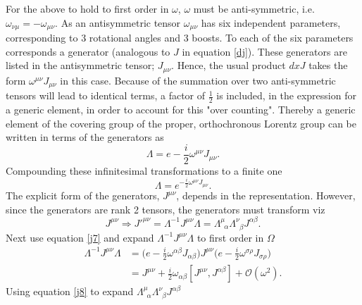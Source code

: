 For the above to hold to first order in $\omega$, $\omega$ must be anti-symmetric, i.e. $\omega_{\nu\mu}=-\omega_{\mu\nu}$. As an antisymmetric tensor $\omega_{\mu\nu}$ has six independent parameters, corresponding to $3$ rotational angles and $3$ boosts. To each of the six parameters corresponds a generator (analogous to $J$ in equation \eqref{dj}). These generators are listed in the antisymmetric tensor; $J_{\mu\nu}$. Hence, the usual product $dxJ$ takes the form $\omega^{\mu\nu}J_{\mu\nu}$ in this case. Because of the summation over two anti-symmetric tensors will lead to identical terms, a factor of $\frac{1}{2}$ is included, in the expression for a generic element, in order to account for this "over counting". Thereby a generic element of the covering group of the proper, orthochronous Lorentz group can be written in terms of the generators as
\begin{equation}
	\Lambda=e-\frac{i}{2}\omega^{\mu\nu}J_{\mu\nu}.
	\label{j7}
\end{equation} 
Compounding these infinitesimal transformations to a finite one
\begin{equation}
	\Lambda=e^{-\frac{i}{2}\omega^{\mu\nu}J_{\mu\nu}}.
\end{equation} 
The explicit form of the generators, $J^{\mu\nu}$, depends in the representation. However, since the generators are rank 2 tensors, the generators must transform viz
\begin{equation}
	J^{\mu\nu}\Rightarrow {J'}^{\mu\nu}=\Lambda^{-1}J^{\mu\nu}\Lambda=\Lambda^{\mu}_{\,\,\, \alpha}\Lambda^{\nu}_{\,\,\, \beta}J^{\alpha\beta}.
	\label{j6}
\end{equation} 
Next use equation \eqref{j7} and expand $\Lambda^{-1}J^{\mu\nu}\Lambda$ to first order in $\Omega$
\begin{equation}
	\begin{split}
		\Lambda^{-1}J^{\mu\nu}\Lambda&=\bigg(e-\frac{i}{2}\omega^{\alpha\beta}J_{\alpha\beta}\bigg)J^{\mu\nu}\bigg(e-\frac{i}{2}\omega^{\sigma\rho}J_{\sigma\rho}\bigg)\\
		&=J^{\mu\nu}+\frac{i}{2}\omega_{\alpha\beta}[J^{\mu\nu},J^{\alpha\beta}]+\mathcal{O}(\omega^2).
		\label{j9}
	\end{split}
\end{equation} 
Using equation \eqref{j8} to expand $\Lambda^{\mu}_{\,\,\, \alpha}\Lambda^{\nu}_{\,\,\, \beta}J^{\alpha\beta}$
